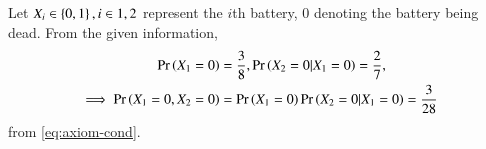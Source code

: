 Let $X_i \in \left\{0,1\right\}, i \in 1,2$ represent the $i$th battery, 0 denoting the battery being dead.
From the given information,
\begin{align}
	\Pr\left(X_1=0\right)&=\frac{3}{8}, \Pr\left(X_2=0|X_1=0\right)=\frac{2}{7}, 
\\
\implies 
\Pr\left(X_1=0, X_2=0\right)&=\Pr\left(X_1=0\right)\Pr\left(X_2=0|X_1=0\right) =\frac{3}{28}
\end{align}
from
\eqref{eq:axiom-cond}.
